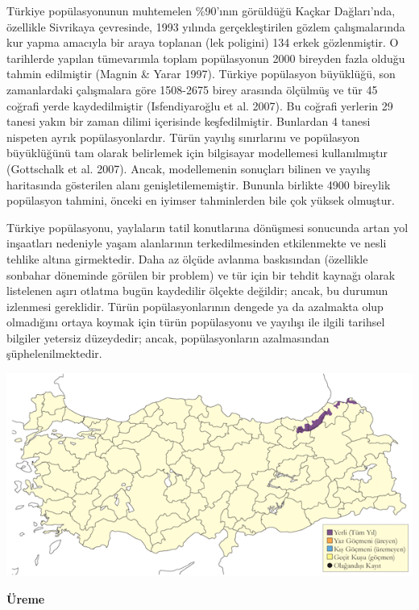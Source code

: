 \documentclass[
  letterpaper,
  DIV=11,
  numbers=noendperiod]{scrreprt}
\begin{document}
Türkiye popülasyonunun muhtemelen \%90'ının görüldüğü Kaçkar
Dağları'nda, özellikle Sivrikaya çevresinde, 1993 yılında
gerçekleştirilen gözlem çalışmalarında kur yapma amacıyla bir araya
toplanan (lek poligini) 134 erkek gözlenmiştir. O tarihlerde yapılan
tümevarımla toplam popülasyonun 2000 bireyden fazla olduğu tahmin
edilmiştir (Magnin \& Yarar 1997). Türkiye popülasyon büyüklüğü, son
zamanlardaki çalışmalara göre 1508-2675 birey arasında ölçülmüş ve tür
45 coğrafi yerde kaydedilmiştir (Isfendiyaroğlu et al. 2007). Bu coğrafi
yerlerin 29 tanesi yakın bir zaman dilimi içerisinde keşfedilmiştir.
Bunlardan 4 tanesi nispeten ayrık popülasyonlardır. Türün yayılış
sınırlarını ve popülasyon büyüklüğünü tam olarak belirlemek için
bilgisayar modellemesi kullanılmıştır (Gottschalk et al. 2007). Ancak,
modellemenin sonuçları bilinen ve yayılış haritasında gösterilen alanı
genişletilememiştir. Bununla birlikte 4900 bireylik popülasyon tahmini,
önceki en iyimser tahminlerden bile çok yüksek olmuştur.

Türkiye popülasyonu, yaylaların tatil konutlarına dönüşmesi sonucunda
artan yol inşaatları nedeniyle yaşam alanlarının terkedilmesinden
etkilenmekte ve nesli tehlike altına girmektedir. Daha az ölçüde avlanma
baskısından (özellikle sonbahar döneminde görülen bir problem) ve tür
için bir tehdit kaynağı olarak listelenen aşırı otlatma bugün kaydedilir
ölçekte değildir; ancak, bu durumun izlenmesi gereklidir. Türün
popülasyonlarının dengede ya da azalmakta olup olmadığını ortaya koymak
için türün popülasyonu ve yayılışı ile ilgili tarihsel bilgiler yetersiz
düzeydedir; ancak, popülasyonların azalmasından şüphelenilmektedir.

\includegraphics{images/harita_Page_037.png}

\textbf{Üreme}
\end{document}
